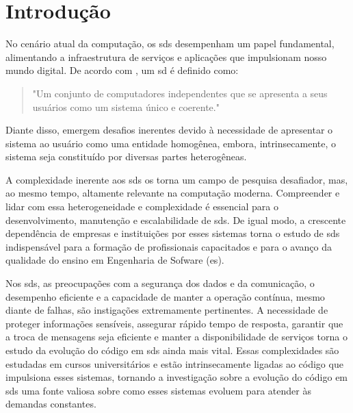 

\chapter{Introdução}\label{cap:introducao}

No cenário atual da computação, os \gls{sds} desempenham um papel fundamental, alimentando a infraestrutura de serviços e aplicações que impulsionam nosso mundo digital. De acordo com , um \gls{sd} é definido como:

\begin{quote}"Um conjunto de computadores independentes que se apresenta a seus usuários como um sistema único e coerente." 
\end{quote}

Diante disso, emergem desafios inerentes devido à necessidade de apresentar o sistema ao usuário como uma entidade homogênea, embora, intrinsecamente, o sistema seja constituído por diversas partes heterogêneas.

A complexidade inerente aos \gls{sds} os torna um campo de pesquisa desafiador, mas, ao mesmo tempo, altamente relevante na computação moderna. Compreender e lidar com essa heterogeneidade e complexidade é essencial para o desenvolvimento, manutenção e escalabilidade de \gls{sds}. De igual modo, a crescente dependência de empresas e instituições por esses sistemas torna o estudo de \gls{sds} indispensável para a formação de profissionais capacitados e para o avanço da qualidade do ensino em Engenharia de Sofware (\gls{es}).

Nos \gls{sds}, as preocupações com a segurança dos dados e da comunicação, o desempenho eficiente e a capacidade de manter a operação contínua, mesmo diante de falhas, são instigações extremamente pertinentes. A necessidade de proteger informações sensíveis, assegurar rápido tempo de resposta, garantir que a troca de mensagens seja eficiente e manter a disponibilidade de serviços torna o estudo da evolução do código em \gls{sds} ainda mais vital. Essas complexidades são estudadas em cursos universitários e estão intrinsecamente ligadas ao código que impulsiona esses sistemas, tornando a investigação sobre a evolução do código em \gls{sds} uma fonte valiosa sobre como esses sistemas evoluem para atender às demandas constantes.

